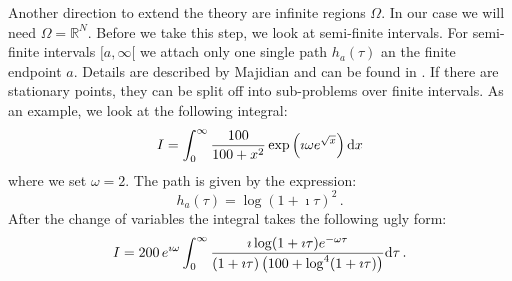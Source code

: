 \documentclass[a4paper,10pt]{article}
\begin{document}
Another direction to extend the theory are infinite regions $\Omega$. In our case we will
need $\Omega = \mathbb{R}^N$. Before we take this step, we look at semi-finite intervals.
For semi-finite intervals $[a, \infty [$ we attach only one single path $h_a(\tau)$ an the
finite endpoint $a$. Details are described by Majidian and can be found in \cite{H_nsd_sii}. If there
are stationary points, they can be split off into sub-problems over finite intervals.
As an example, we look at the following integral:
\begin{equation}
  I = \int_0^\infty \frac{100}{100 + x^2} \exp\left(\imath \omega e^{\sqrt{x}}\right) \mathrm{d}x
\end{equation}
where we set $\omega = 2$. The path is given by the expression:
\begin{equation}
  h_a(\tau) = \log(1 + \imath\tau)^2 \,.
\end{equation}
After the change of variables the integral takes the following ugly form:
\begin{equation}
  I = 200 \, e^{\imath\omega}
      \int_0^{\infty}
        \frac{\imath \log(1+\imath\tau) e^{-\omega\tau}}
             {(1 + \imath\tau)\left(100+\log^4(1+\imath\tau)\right)}
      \mathrm{d}\tau \,.
\end{equation}
\end{document}
